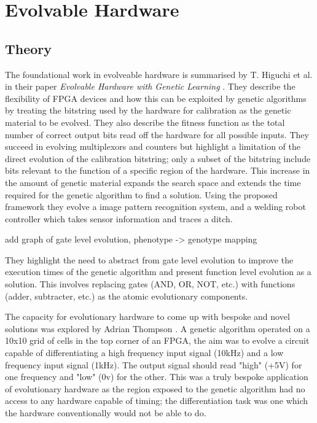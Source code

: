 \section{Evolvable Hardware}

\subsection{Theory}
The foundational work in evolveable hardware is summarised by T. Higuchi et al. in their
paper {\em Evolvable Hardware with Genetic Learning} \cite{541893}. They describe
the flexibility of FPGA devices and how this can be exploited by genetic algorithms
by treating the bitstring used by the hardware for calibration as the genetic material
to be evolved. They also describe the fitness function as the total number of correct
output bits read off the hardware for all possible inputs. They succeed in evolving multiplexors and
counters but highlight a limitation of the direct evolution of the calibration
bitstring; only a subset of the bitstring include bits relevant to the function
of a specific region of the hardware. This increase in the amount of genetic
material expands the search space and extends the time required for the genetic algorithm to find a solution.
Using the proposed framework they evolve a image pattern recognition system,
and a welding robot controller which takes sensor information and traces a ditch.

\todo add graph of gate level evolution, phenotype -> genotype mapping

They highlight the need to abstract from gate level evolution to improve the
execution times of the genetic algorithm and present function level evolution
as a solution. This involves replacing gates (AND, OR, NOT, etc.) with functions
(adder, subtracter, etc.) as the atomic evolutionary components.

The capacity for evolutionary hardware to come up with bespoke and novel solutions
was explored by Adrian Thompson \cite{10.1007/3-540-63173-9_61}. A genetic algorithm
operated on a 10x10 grid of cells in the top corner of an FPGA, the aim was to evolve
a circuit capable of differentiating a high frequency input signal (10kHz) and a
low frequency input signal (1kHz). The output signal should read "high" (+5V) for one frequency
and "low" (0v) for the other. This was a truly bespoke application of evolutionary
hardware as the region exposed to the genetic algorithm had no access to any
hardware capable of timing; the differentiation task was one which the hardware
conventionally would not be able to do.

